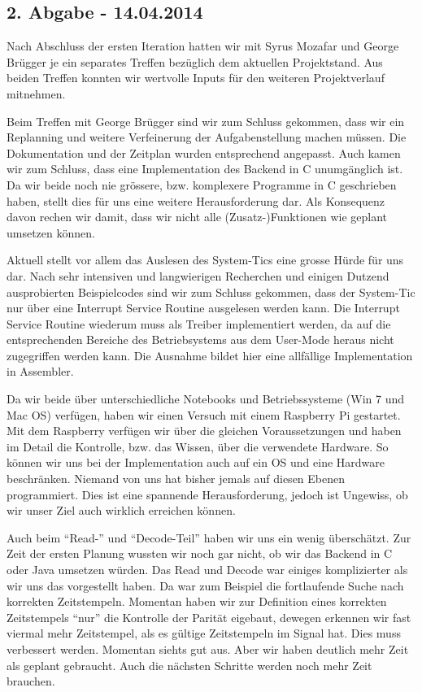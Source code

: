 \subsection{2. Abgabe - 14.04.2014}
Nach Abschluss der ersten Iteration hatten wir mit Syrus Mozafar und George Brügger je ein separates Treffen bezüglich dem aktuellen Projektstand. Aus beiden Treffen konnten wir wertvolle Inputs für den weiteren Projektverlauf mitnehmen. 

Beim Treffen mit George Brügger sind wir zum Schluss gekommen, dass wir ein Replanning und weitere Verfeinerung der Aufgabenstellung machen müssen. Die Dokumentation und der Zeitplan wurden entsprechend angepasst. Auch kamen wir zum Schluss, dass eine Implementation des Backend in C unumgänglich ist. Da wir beide noch nie grössere, bzw. komplexere Programme in C geschrieben haben, stellt dies für uns eine weitere Herausforderung dar. Als Konsequenz davon rechen wir damit, dass wir nicht alle (Zusatz-)Funktionen wie geplant umsetzen können.

Aktuell stellt vor allem das Auslesen des System-Tics eine grosse Hürde für uns dar. Nach sehr intensiven und langwierigen Recherchen und einigen Dutzend ausprobierten Beispielcodes sind wir zum Schluss gekommen, dass der System-Tic nur über eine Interrupt Service Routine ausgelesen werden kann. Die Interrupt Service Routine wiederum muss als Treiber implementiert werden, da auf die entsprechenden Bereiche des Betriebsystems aus dem User-Mode heraus nicht zugegriffen werden kann. Die Ausnahme bildet hier eine allfällige Implementation in Assembler.

Da wir beide über unterschiedliche Notebooks und Betriebssysteme (Win 7 und Mac OS) verfügen, haben wir einen Versuch mit einem Raspberry Pi gestartet. Mit dem Raspberry verfügen wir über die gleichen Voraussetzungen und haben im Detail die Kontrolle, bzw. das Wissen, über die verwendete Hardware. So können wir uns bei der Implementation auch auf ein OS und eine Hardware beschränken. Niemand von uns hat bisher jemals auf diesen Ebenen programmiert. Dies ist eine spannende Herausforderung, jedoch ist Ungewiss, ob wir unser Ziel auch wirklich erreichen können.

Auch beim "`Read-"' und "`Decode-Teil"' haben wir uns ein wenig überschätzt. Zur Zeit der ersten Planung wussten wir noch gar nicht, ob wir das Backend in C oder Java umsetzen würden.
Das Read und Decode war einiges komplizierter als wir uns das vorgestellt haben. Da war zum Beispiel die fortlaufende Suche nach korrekten Zeitstempeln. Momentan haben wir zur Definition eines korrekten Zeitstempels "`nur"' die Kontrolle der Parität eigebaut, dewegen erkennen wir fast viermal mehr Zeitstempel, als es gültige Zeitstempeln im Signal hat. Dies muss verbessert werden.
Momentan siehts gut aus. Aber wir haben deutlich mehr Zeit als geplant gebraucht. Auch die nächsten Schritte werden noch mehr Zeit brauchen.

